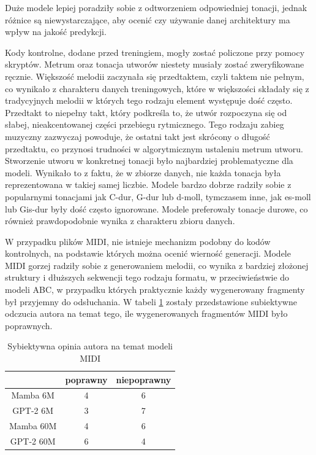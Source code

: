 \documentclass[data-science]{agh-wi} %
\begin{document}
Duże modele lepiej poradziły sobie z odtworzeniem odpowiedniej tonacji, jednak różnice są niewystarczające, aby ocenić czy używanie danej architektury ma wpływ na jakość predykcji.

Kody kontrolne, dodane przed treningiem, mogły zostać policzone przy pomocy skryptów. Metrum oraz tonacja utworów niestety musiały zostać zweryfikowane ręcznie. Większość melodii zaczynała się przedtaktem, czyli taktem nie pełnym, co wynikało z charakteru danych treningowych, które w większości składały się z tradycyjnych melodii w których tego rodzaju element występuje dość często. Przedtakt to niepełny takt, który podkreśla to, że utwór rozpoczyna się od słabej, nieakcentowanej części przebiegu rytmicznego. Tego rodzaju zabieg muzyczny zazwyczaj powoduje, że ostatni takt jest skrócony o długość przedtaktu, co przynosi trudności w algorytmicznym ustaleniu metrum utworu. Stworzenie utworu w konkretnej tonacji było najbardziej problematyczne dla modeli. Wynikało to z faktu, że w zbiorze danych, nie każda tonacja była reprezentowana w takiej samej liczbie. Modele bardzo dobrze radziły sobie z popularnymi tonacjami jak C-dur, G-dur lub d-moll, tymczasem inne, jak es-moll lub Gis-dur były dość często ignorowane. Modele preferowały tonacje durowe, co również prawdopodobnie wynika z charakteru zbioru danych.

W przypadku plików MIDI, nie istnieje mechanizm podobny do kodów kontrolnych, na podstawie których można ocenić wierność generacji. Modele MIDI gorzej radziły sobie z generowaniem melodii, co wynika z bardziej złożonej struktury i dłuższych sekwencji tego rodzaju formatu, w przeciwieństwie do modeli ABC, w przypadku których praktycznie każdy wygenerowany fragmenty był przyjemny do odsłuchania. W tabeli \ref*{tab:midi_gen} zostały przedstawione subiektywne odczucia autora na temat tego, ile wygenerowanych fragmentów MIDI było poprawnych.

\begin{table}[ht!]
    \centering
    \begin{tabular}{|c|c|c|}
    \hline
              & poprawny & niepoprawny \\ \hline
    Mamba 6M  & 4        & 6           \\ \hline
    GPT-2 6M  & 3        & 7           \\ \hline
    Mamba 60M & 4        & 6           \\ \hline
    GPT-2 60M & 6        & 4           \\ \hline
    \end{tabular}
    \caption{Sybiektywna opinia autora na temat modeli MIDI}\label{tab:midi_gen}
\end{table}
\end{document}
